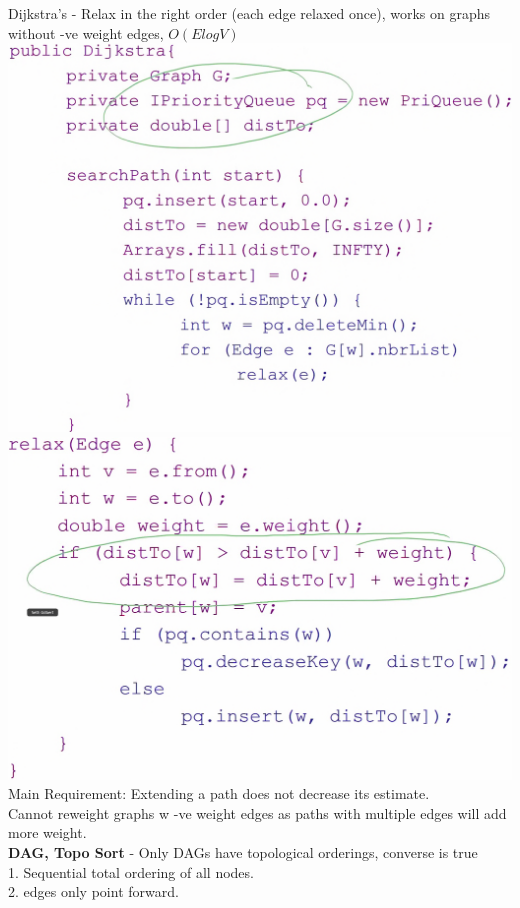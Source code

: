 \documentclass[10pt, a4paper]{article}
\begin{document}
\begin{multicols*}{3}
		Dijkstra's - Relax in the right order (each edge relaxed once), works on graphs without -ve weight edges, $O(ElogV)$\\
		\includegraphics[scale=.09]{./assets/Dijkstra}
		\includegraphics[scale=.09]{./assets/Dijkstra2}\\
		Main Requirement: Extending a path does not decrease its estimate.\\
		Cannot reweight graphs w -ve weight edges as paths with multiple edges will add more weight.\\
		\textbf{DAG, Topo Sort} - Only DAGs have topological orderings, converse is true\\
		1. Sequential total ordering of all nodes.\\
		2. edges only point forward.\\

\end{multicols*}
\end{document}
